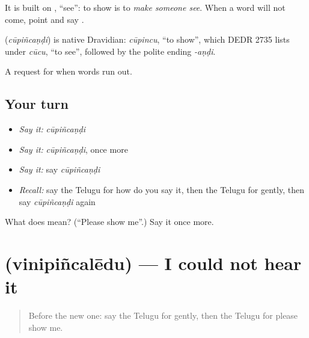 It is built on \textbf{}, \textquotedblleft{}see\textquotedblright{}: to show is to \emph{make someone see}. When a word will not come, point and say \textbf{}.

\begin{cousinweb}
\textbf{} (\emph{cūpiñcaṇḍi}) is native Dravidian: \emph{cūpincu}, \textquotedblleft{}to show\textquotedblright{}, which DEDR 2735 lists under \emph{cūcu}, \textquotedblleft{}to see\textquotedblright{}, followed by the polite ending \emph{-aṇḍi}.
\end{cousinweb}

\begin{grammarlens}[title={What you've built}]
A request for when words run out.
\end{grammarlens}

\subsection*{Your turn}
\begin{itemize}
\raggedright
  \item \emph{Say it:} \emph{cūpiñcaṇḍi}
  \item \emph{Say it:} \emph{cūpiñcaṇḍi}, once more
  \item \emph{Say it:} say \emph{cūpiñcaṇḍi}
  \item \emph{Recall:} say the Telugu for how do you say it, then the Telugu for gently, then say \emph{cūpiñcaṇḍi} again
\end{itemize}

\begin{tcolorbox}[breakable,colback=teal!4,colframe=teal!35!black,title={Before you move on}]
What does  mean? (\textquotedblleft{}Please show me\textquotedblright{}.) Say it once more.
\end{tcolorbox}
\section[\texorpdfstring{\te{వినిపించలేదు} (vinipiñcalēdu)}{వినిపించలేదు (vinipiñcalēdu)}]{ (vinipiñcalēdu) — I could not hear it}

\label{lesson:TE-C95-didnthear}



\begin{quote}
Before the new one: say the Telugu for gently, then the Telugu for please show me.
\end{quote}

